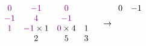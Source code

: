 \documentclass[11pt]{article}
\begin{document}
\[
\begin{array}{cccccccc}
    &\textcolor{violet}{0}&\textcolor{violet}{-1}& \textcolor{violet}{0}& \\
    &\textcolor{violet}{-1}&\textcolor{violet}{4}&\textcolor{violet}{-1} & \\
    &\textcolor{violet}{1}&\textcolor{violet}{-1}\times 1&\textcolor{violet}{0} \times 4 & 1 \\ 
    & & 2 & 5 & 3 & \\ 
\end{array}
\rightarrow
\begin{array}{ccccc}
    0 & -1 &  & &  \\
     &  &  & &  \\
     &  &  & &  \\
     &  &  & &  \\
\end{array}
\]
\end{document}
